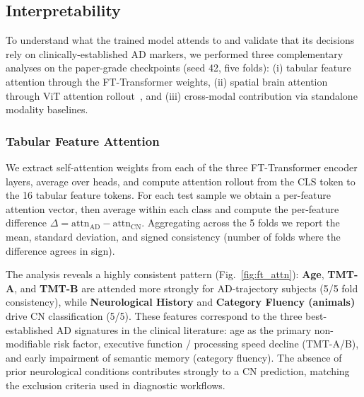 
\subsection{Interpretability}

To understand what the trained model attends to and validate that its decisions rely on clinically-established AD markers, we performed three complementary analyses on the paper-grade checkpoints (seed 42, five folds): (i) tabular feature attention through the FT-Transformer weights, (ii) spatial brain attention through ViT attention rollout~\cite{abnar2020quantifying}, and (iii) cross-modal contribution via standalone modality baselines.

\subsubsection{Tabular Feature Attention}

We extract self-attention weights from each of the three FT-Transformer encoder layers, average over heads, and compute attention rollout from the CLS token to the 16 tabular feature tokens. For each test sample we obtain a per-feature attention vector, then average within each class and compute the per-feature difference \mbox{$\Delta = \text{attn}_{\text{AD}} - \text{attn}_{\text{CN}}$}. Aggregating across the 5 folds we report the mean, standard deviation, and signed consistency (number of folds where the difference agrees in sign).

The analysis reveals a highly consistent pattern (Fig.~\ref{fig:ft_attn}): \textbf{Age}, \textbf{TMT-A}, and \textbf{TMT-B} are attended more strongly for AD-trajectory subjects (5/5 fold consistency), while \textbf{Neurological History} and \textbf{Category Fluency (animals)} drive CN classification (5/5). These features correspond to the three best-established AD signatures in the clinical literature: age as the primary non-modifiable risk factor, executive function / processing speed decline (TMT-A/B), and early impairment of semantic memory (category fluency). The absence of prior neurological conditions contributes strongly to a CN prediction, matching the exclusion criteria used in diagnostic workflows.

